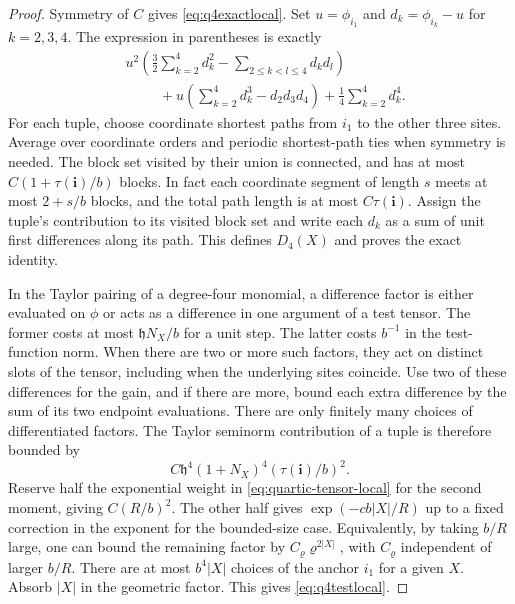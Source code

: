 \documentclass[11pt]{article}
\begin{document}
\begin{proof}
Symmetry of \(C\) gives \eqref{eq:q4exactlocal}. Set \(u=\phi_{i_1}\)
and \(d_k=\phi_{i_k}-u\) for \(k=2,3,4\). The expression in
parentheses is exactly
\begin{align*}
 &u^2\left(\tfrac32\sum_{k=2}^4d_k^2-
                         \sum_{2\le k<l\le4}d_kd_l\right)\\
 &\hspace{1cm}+u\left(\sum_{k=2}^4d_k^3-d_2d_3d_4\right)
                         +\tfrac14\sum_{k=2}^4d_k^4 .
\end{align*}
For each tuple, choose coordinate shortest paths from \(i_1\)
to the other three sites. Average over coordinate orders and
periodic shortest-path ties when symmetry is needed. The block
set visited by their union is connected, and has at most
\(C(1+\tau(\boldsymbol i)/b)\) blocks. In fact each coordinate
segment of length \(s\) meets at most \(2+s/b\) blocks, and
the total path length is at most \(C\tau(\boldsymbol i)\).
Assign the tuple's contribution to its visited block set and
write each \(d_k\) as a sum of unit first differences along
its path. This defines \(D_4(X)\) and proves the exact identity.

In the Taylor pairing of a degree-four monomial, a difference
factor is either evaluated on \(\phi\) or acts as a difference
in one argument of a test tensor. The former costs at most
\(\mathfrak h N_X/b\) for a unit step. The latter costs
\(b^{-1}\) in the test-function norm. When there are two or
more such factors, they act on distinct slots of the tensor,
including when the underlying sites coincide. Use two of these
differences for the gain, and if there are more, bound each extra
difference by the sum of its two endpoint evaluations. There
are only finitely many choices of differentiated factors. The
Taylor seminorm contribution of a tuple is therefore bounded by
\[
 C\mathfrak h^4(1+N_X)^4(\tau(\boldsymbol i)/b)^2.
\]
Reserve half the exponential weight in \eqref{eq:quartic-tensor-local}
for the second moment, giving \(C(R/b)^2\). The other half gives
\(\exp(-c b|X|/R)\) up to a fixed correction in the exponent
for the bounded-size case. Equivalently, by taking \(b/R\) large,
one can bound the remaining factor by \(C_\varrho\varrho^{2|X|}\),
with \(C_\varrho\) independent of larger \(b/R\). There are at most
\(b^4|X|\) choices of the anchor \(i_1\) for a given \(X\).
Absorb \(|X|\) in the geometric factor. This gives
\eqref{eq:q4testlocal}.
\end{proof}
\end{document}
